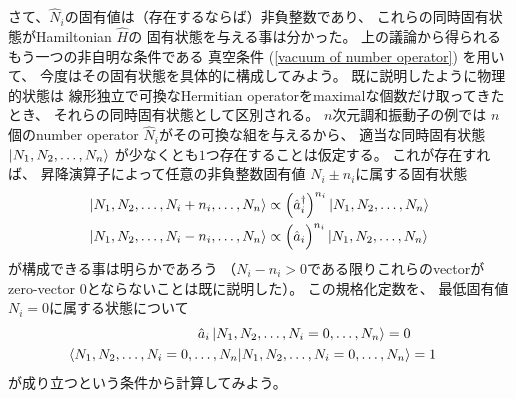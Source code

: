 さて、$\hat{N}_i$の固有値は（存在するならば）非負整数であり、
これらの同時固有状態がHamiltonian $\hat{H}$の
固有状態を与える事は分かった。
上の議論から得られるもう一つの非自明な条件である
真空条件
(\ref{vacuum of number operator})
を用いて、
今度はその固有状態を具体的に構成してみよう。
既に説明したように物理的状態は
線形独立で可換なHermitian operatorをmaximalな個数だけ取ってきたとき、
それらの同時固有状態として区別される。
$n$次元調和振動子の例では
$n$個のnumber operator $\hat{N}_i$がその可換な組を与えるから、
適当な同時固有状態
$\ket{N_1, N_2,\dots, N_n}$
が少なくとも$1$つ存在することは仮定する。
これが存在すれば、
昇降演算子によって任意の非負整数固有値
$N_i\pm n_i$に属する固有状態
\begin{subequations}
\begin{align}
    \ket{N_1, N_2,\dots,N_i+n_i,\dots, N_n}
    &\propto
    \left(
        \hat{a}_i^\dagger
    \right)^{n_i}
    \ket{N_1, N_2,\dots, N_n}
\\
    \ket{N_1, N_2,\dots,N_i-n_i,\dots, N_n}
    &\propto
    \Big(
        \hat{a}_i
    \Big)^{n_i}
    \ket{N_1, N_2,\dots, N_n}
\end{align}
\end{subequations}
が構成できる事は明らかであろう
（$N_i - n_i > 0$である限りこれらのvectorが
zero-vector $0$とならないことは既に説明した）。
この規格化定数を、
最低固有値$N_i = 0$に属する状態について
\begin{align}
    \hat{a}_i \ket{N_1, N_2,\dots, N_i = 0,\dots, N_n} = 0
\\
    \braket{N_1, N_2,\dots, N_i = 0,\dots, N_n
    |
    N_1, N_2,\dots, N_i = 0,\dots, N_n}
    &=1
\end{align}
が成り立つという条件から計算してみよう。

